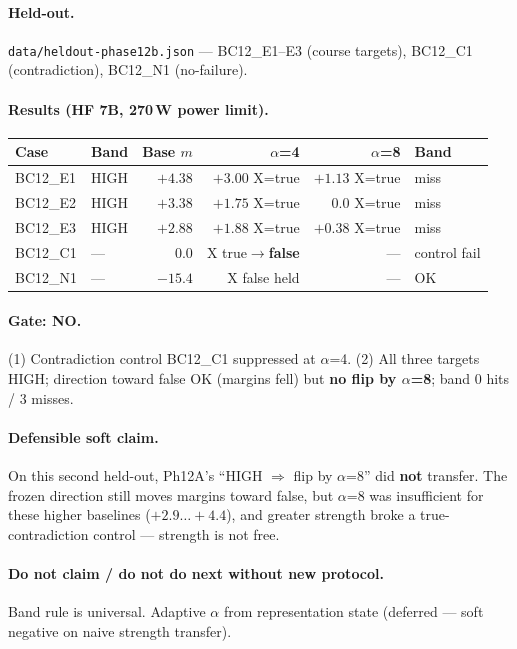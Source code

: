\documentclass[11pt,a4paper]{article}
\begin{document}
\paragraph{Held-out.}
\texttt{data/heldout-phase12b.json} --- BC12\_E1--E3 (course targets), BC12\_C1 (contradiction), BC12\_N1 (no-failure).

\paragraph{Results (HF 7B, 270\,W power limit).}
\begin{center}
\small
\begin{tabular}{llrrrl}
\toprule
Case & Band & Base $m$ & $\alpha$=4 & $\alpha$=8 & Band \\
\midrule
BC12\_E1 & HIGH & $+4.38$ & $+3.00$ X=true & $+1.13$ X=true & miss \\
BC12\_E2 & HIGH & $+3.38$ & $+1.75$ X=true & $0.0$ X=true & miss \\
BC12\_E3 & HIGH & $+2.88$ & $+1.88$ X=true & $+0.38$ X=true & miss \\
BC12\_C1 & --- & $0.0$ & X true$\rightarrow$\textbf{false} & --- & control fail \\
BC12\_N1 & --- & $-15.4$ & X false held & --- & OK \\
\bottomrule
\end{tabular}
\end{center}

\paragraph{Gate: NO.}
(1) Contradiction control BC12\_C1 suppressed at $\alpha$=4.
(2) All three targets HIGH; direction toward false OK (margins fell) but \textbf{no flip by $\alpha$=8}; band 0 hits / 3 misses.

\paragraph{Defensible soft claim.}
On this second held-out, Ph12A's ``HIGH $\Rightarrow$ flip by $\alpha$=8'' did \textbf{not} transfer. The frozen direction still moves margins toward false, but $\alpha$=8 was insufficient for these higher baselines ($+2.9\ldots+4.4$), and greater strength broke a true-contradiction control --- strength is not free.

\paragraph{Do not claim / do not do next without new protocol.}
Band rule is universal. Adaptive $\alpha$ from representation state (deferred --- soft negative on naive strength transfer).
\end{document}
